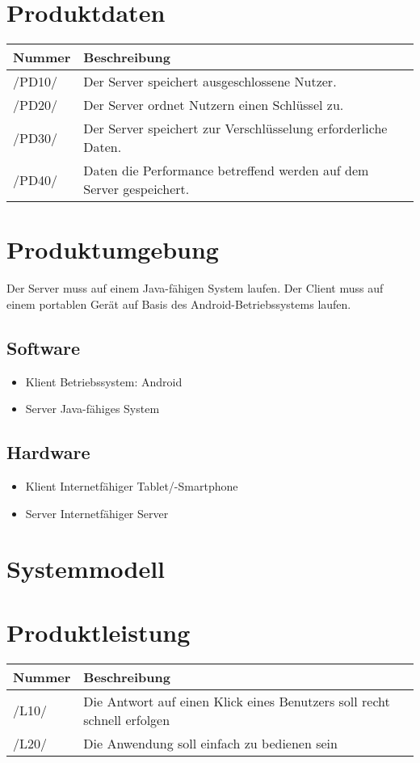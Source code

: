 \documentclass[a4paper,10pt]{article}
\newcommand\addrow[2]{#1 &#2\\ }
\newcommand\addheading[2]{#1 &#2\\ \hline}
\newcommand\tabularhead{\begin{tabular}{lp{13cm}}
\hline
}
\newenvironment{usecase}{\tabularhead}
{\hline\end{tabular}}
\begin{document}
\section{Produktdaten}
\newcommand{\datenKuerzel}{PD}
\begin{usecase}
\addheading{Nummer}{Beschreibung}
\addrow{/\datenKuerzel10/} {Der Server speichert ausgeschlossene Nutzer.}
\addrow{/\datenKuerzel20/} {Der Server ordnet Nutzern einen Schlüssel zu.}
\addrow{/\datenKuerzel30/} {Der Server speichert zur Verschlüsselung erforderliche Daten.}
\addrow{/\datenKuerzel40/} {Daten die Performance betreffend werden auf dem Server gespeichert.}
\end{usecase}

\section{Produktumgebung}
Der Server muss auf einem Java-fähigen System laufen.
Der Client muss auf einem portablen Gerät auf Basis des Android-Betriebssystems laufen.
\subsection{Software}
\begin{itemize}
\item Klient\newline
Betriebssystem: Android
\item Server\newline
Java-fähiges System
\end{itemize}
\subsection{Hardware}
\begin{itemize}
\item Klient\newline
Internetfähiger Tablet/-Smartphone
\item Server\newline
Internetfähiger Server
\end{itemize}


\section{Systemmodell}

\section{Produktleistung}
\newcommand{\leistungKuerzel}{L}
\begin{usecase}
\addheading{Nummer}{Beschreibung}
\addrow{/\leistungKuerzel10/} {Die Antwort auf einen Klick eines Benutzers soll recht schnell 
                               erfolgen}
\addrow{/\leistungKuerzel20/} {Die Anwendung soll einfach zu bedienen sein}
\end{usecase}
\end{document}
